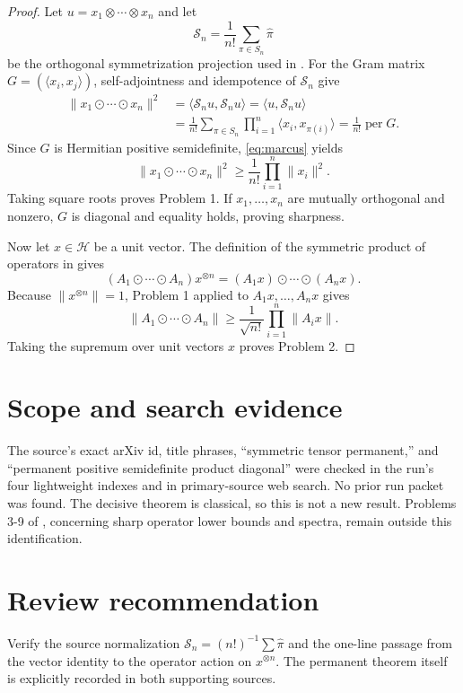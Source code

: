 \documentclass[11pt]{article}
\newcommand{\Hh}{\mathcal H}
\newcommand{\permanent}{\operatorname{per}}
\begin{document}
\begin{proof}
Let $u=x_1\otimes\cdots\otimes x_n$ and let
\[
 \mathcal S_n=\frac1{n!}\sum_{\pi\in S_n}\widehat\pi
\]
be the orthogonal symmetrization projection used in \cite{GOY}. For the Gram
matrix $G=(\langle x_i,x_j\rangle)$, self-adjointness and idempotence of
$\mathcal S_n$ give
\begin{align*}
 \|x_1\odot\cdots\odot x_n\|^2
 &=\langle\mathcal S_nu,\mathcal S_nu\rangle
  =\langle u,\mathcal S_nu\rangle\\
 &=\frac1{n!}\sum_{\pi\in S_n}
      \prod_{i=1}^n\langle x_i,x_{\pi(i)}\rangle
  =\frac1{n!}\permanent G.
\end{align*}
Since $G$ is Hermitian positive semidefinite, \eqref{eq:marcus} yields
\[
 \|x_1\odot\cdots\odot x_n\|^2
 \geq\frac1{n!}\prod_{i=1}^n\|x_i\|^2.
\]
Taking square roots proves Problem 1. If $x_1,\ldots,x_n$ are mutually
orthogonal and nonzero, $G$ is diagonal and equality holds, proving sharpness.

Now let $x\in\Hh$ be a unit vector. The definition of the symmetric product of
operators in \cite{GOY} gives
\[
 (A_1\odot\cdots\odot A_n)x^{\otimes n}
 =(A_1x)\odot\cdots\odot(A_nx).
\]
Because $\|x^{\otimes n}\|=1$, Problem 1 applied to
$A_1x,\ldots,A_nx$ gives
\[
 \|A_1\odot\cdots\odot A_n\|
 \geq\frac1{\sqrt{n!}}\prod_{i=1}^n\|A_i x\|.
\]
Taking the supremum over unit vectors $x$ proves Problem 2.
\end{proof}

\section*{Scope and search evidence}
The source's exact arXiv id, title phrases, ``symmetric tensor permanent,'' and
``permanent positive semidefinite product diagonal'' were checked in the run's
four lightweight indexes and in primary-source web search. No prior run packet
was found. The decisive theorem is classical, so this is not a new result.
Problems 3-9 of \cite{GOY}, concerning sharp operator lower bounds and spectra,
remain outside this identification.

\section*{Review recommendation}
Verify the source normalization $\mathcal S_n=(n!)^{-1}\sum\widehat\pi$ and
the one-line passage from the vector identity to the operator action on
$x^{\otimes n}$. The permanent theorem itself is explicitly recorded in both
supporting sources.
\end{document}
